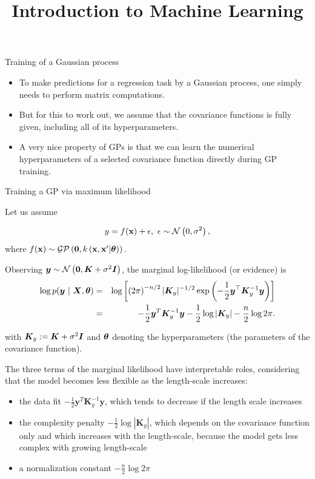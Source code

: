 \documentclass[11pt,compress,t,notes=noshow, xcolor=table]{beamer}
\title{Introduction to Machine Learning}
\date{}
\begin{document}


\begin{vbframe}{Training of a Gaussian process}

\begin{itemize}
\item To make predictions for a regression task by a Gaussian process, one simply needs to perform matrix computations.
\vspace{.5cm}
\item But for this to work out, we assume that the covariance functions is fully given, including all of its hyperparameters.
\vspace{.5cm}
\item A very nice property of GPs is that we can learn the numerical hyperparameters of a selected covariance function directly during GP training.
\end{itemize}

\end{vbframe}

\begin{vbframe}{Training a GP via maximum likelihood}

Let us assume 

$$
	y = f(\mathbf{x}) + \epsilon, ~ \epsilon \sim \mathcal{N}\left(0, \sigma^2\right),
$$
where $f(\mathbf{x}) \sim \mathcal{GP}\left(\bm{0}, k\left(\mathbf{x}, \mathbf{x}^\prime | \bm{\theta} \right)\right)$. 

\lz 

Observing $\bm{y} \sim \mathcal{N}\left(\bm{0}, \bm{K} + \sigma^2 \boldsymbol{I}\right)$, the marginal log-likelihood (or evidence) is
\begin{eqnarray*}
\log p(\bm{y} ~|~ \bm{X}, \bm{\theta}) &=& \log \left[\left(2 \pi\right)^{-n / 2} |\bm{K}_y|^{-1 / 2} \exp\left(- \frac{1}{2} \bm{y}^\top \bm{K}_y^{-1} \bm{y}\right) \right]\\
&=& -\frac{1}{2}\bm{y}^T\bm{K}_y^{-1} \bm{y} - \frac{1}{2} \log \left| \bm{K}_y \right| - \frac{n}{2} \log 2\pi. 
\end{eqnarray*}

with $\bm{K}_y:=\bm{K} + \sigma^2 \boldsymbol{I}$ and $\bm{\theta}$ denoting the hyperparameters (the parameters of the covariance function). 

\framebreak


The three terms of the marginal likelihood have interpretable roles, considering that 
the model becomes less flexible as the length-scale increases:

\begin{itemize}
\item the data fit $-\frac{1}{2}\bm{y}^T\bm{K}_y^{-1} \bm{y}$, which tends to decrease if the length scale increases
\item the complexity penalty $- \frac{1}{2} \log \left| \bm{K}_y \right|$, which depends on the covariance function only and which increases with the length-scale, because the model gets less complex with growing length-scale
\item a normalization constant $- \frac{n}{2} \log 2\pi$
\end{itemize}

\end{vbframe}
\end{document}
